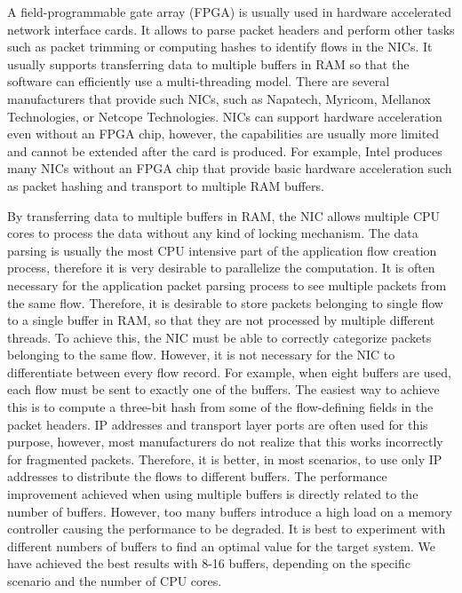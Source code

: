 A field-programmable gate array (FPGA) is usually used in hardware accelerated network interface cards. It allows to parse packet headers and perform other tasks such as packet trimming or computing hashes to identify flows in the NICs. It usually supports transferring data to multiple buffers in RAM so that the software can efficiently use a multi-threading model. There are several manufacturers that provide such NICs, such as Napatech, Myricom, Mellanox Technologies, or Netcope Technologies. NICs can support hardware acceleration even without an FPGA chip, however, the capabilities are usually more limited and cannot be extended after the card is produced. For example, Intel produces many NICs without an FPGA chip that provide basic hardware acceleration such as packet hashing and transport to multiple RAM buffers.

By transferring data to multiple buffers in RAM, the NIC allows multiple CPU cores to process the data without any kind of locking mechanism. The data parsing is usually the most CPU intensive part of the application flow creation process, therefore it is very desirable to parallelize the computation. It is often necessary for the application packet parsing process to see multiple packets from the same flow. Therefore, it is desirable to store packets belonging to single flow to a single buffer in RAM, so that they are not processed by multiple different threads. To achieve this, the NIC must be able to correctly categorize packets belonging to the same flow. However, it is not necessary for the NIC to differentiate between every flow record. For example, when eight buffers are used, each flow must be sent to exactly one of the buffers. The easiest way to achieve this is to compute a three-bit hash from some of the flow-defining fields in the packet headers. IP addresses and transport layer ports are often used for this purpose, however, most manufacturers do not realize that this works incorrectly for fragmented packets. Therefore, it is better, in most scenarios, to use only IP addresses to distribute the flows to different buffers. The performance improvement achieved when using multiple buffers is directly related to the number of buffers. However, too many buffers introduce a high load on a memory controller causing the performance to be degraded. It is best to experiment with different numbers of buffers to find an optimal value for the target system. We have achieved the best results with 8-16 buffers, depending on the specific scenario and the number of CPU cores.

